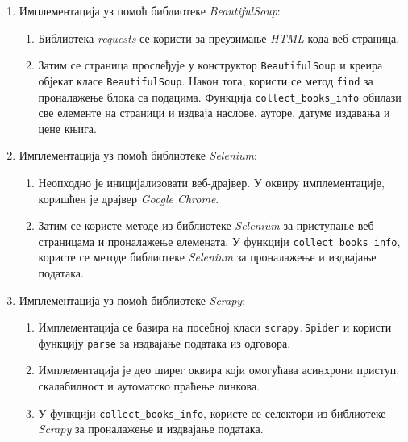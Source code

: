 \documentclass[12pt,oneside]{memoir}
\begin{document}
\begin{enumerate}
\item Имплементација уз помоћ библиотеке \textit{BeautifulSoup}:
\begin{enumerate}
\item Библиотека \textit{requests} се користи за преузимање \textit{HTML} кода веб-страница.
\item Затим се страница прослеђује у конструктор \texttt{BeautifulSoup} и креира објекат класе \texttt{BeautifulSoup}. Након тога, користи се метод \texttt{find} за проналажење блока са подацима. Функција \texttt{collect\_books\_info} обилази све елементе на страници и издваја наслове, ауторе, датуме издавања и цене књига.
\end{enumerate}
\item Имплементација уз помоћ библиотеке \textit{Selenium}:
\begin{enumerate}
\item Неопходно је иницијализовати веб-драјвер. У оквиру имплементације, коришћен је драјвер \textit{Google Chrome}.
\item Затим се користе методе из библиотеке \textit{Selenium} за приступање веб-страницама и проналажење елемената. У функцији \texttt{collect\_books\_info}, користе се методе библиотеке \textit{Selenium} за проналажење и издвајање података.

\end{enumerate}
\item Имплементација уз помоћ библиотеке \textit{Scrapy}:
\begin{enumerate}
\item Имплементација се базира на посебној класи \texttt{scrapy.Spider} и користи функцију \texttt{parse} за издвајање података из одговора. 
\item Имплементација је део ширег оквира који омогућава асинхрони приступ, скалабилност и аутоматско праћење линкова.
\item У функцији \texttt{collect\_books\_info}, користе се селектори из библиотеке \textit{Scrapy} за проналажење и издвајање података.

\end{enumerate}
\end{enumerate}
\end{document}
